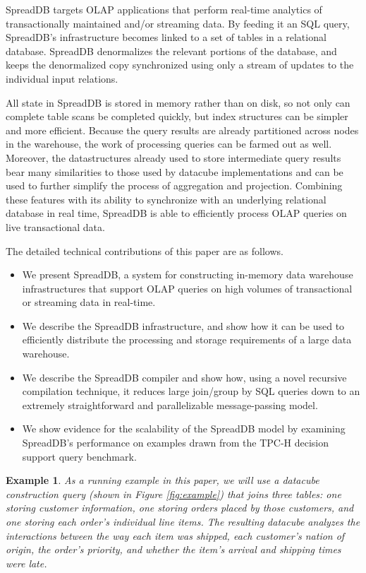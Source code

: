 \documentclass{sig-alternate}
\newtheorem{example}{Example}
\begin{document}
SpreadDB targets OLAP applications that perform real-time analytics of transactionally maintained and/or streaming data.  By feeding it an SQL query, SpreadDB's infrastructure becomes linked to a set of tables in a relational database.  SpreadDB denormalizes the relevant portions of the database, and keeps the denormalized copy synchronized using only a stream of updates to the individual input relations.  

All state in SpreadDB is stored in memory rather than on disk, so not only can complete table scans be completed quickly, but index structures can be simpler and more efficient.  Because the query results are already partitioned across nodes in the warehouse, the work of processing queries can be farmed out as well.  Moreover, the datastructures already used to store intermediate query results bear many similarities to those used by datacube\cite{datacube} implementations and can be used to further simplify the process of aggregation and projection.  Combining these features with its ability to synchronize with an underlying relational database in real time, SpreadDB is able to efficiently process OLAP queries on live transactional data. 

The detailed technical contributions of this paper are as follows.
\begin{itemize}
\item We present SpreadDB, a system for constructing in-memory data warehouse infrastructures that support OLAP queries on high volumes of transactional or streaming data in real-time.

\item We describe the SpreadDB infrastructure, and show how it can be used to efficiently distribute the processing and storage requirements of a large data warehouse.

\item We describe the SpreadDB compiler and show how, using a novel recursive compilation technique, it reduces large join/group by SQL queries down to an extremely straightforward and parallelizable message-passing model. 

\item We show evidence for the scalability of the SpreadDB model by examining SpreadDB's performance on examples drawn from the TPC-H\cite{tpch2008} decision support query benchmark. 
\end{itemize}

\begin{example}\textit
As a running example in this paper, we will use a datacube construction query (shown in Figure \ref{fig:example}) that joins three tables: one storing customer information, one storing orders placed by those customers, and one storing each order's individual line items.  The resulting datacube analyzes the interactions between the way each item was shipped, each customer's nation of origin, the order's priority, and whether the item's arrival and shipping times were late.
\end{example}
\end{document}
